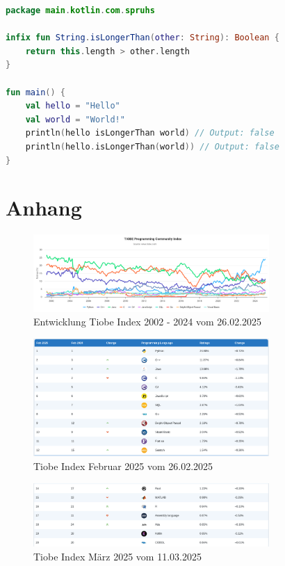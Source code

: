 \documentclass[11pt]{article}
\begin{document}
    \begin{lstlisting}[language=Kotlin, caption={InfixNotation.kt}, label={lst:kotlin-infix-notation}]
package main.kotlin.com.spruhs

infix fun String.isLongerThan(other: String): Boolean {
    return this.length > other.length
}

fun main() {
    val hello = "Hello"
    val world = "World!"
    println(hello isLongerThan world) // Output: false
    println(hello.isLongerThan(world)) // Output: false
}
    \end{lstlisting}

    \printbibliography[
        heading=bibintoc,
        title={Literaturverzeichnis}
    ]
    \appendix
    \section{Anhang}

    \begin{figure}[h]
        \centering
        \includegraphics[width=0.8\textwidth]{pictures/Screenshot 2025-02-26 at 19-53-49 TIOBE Index - TIOBE}
        \caption{Entwicklung Tiobe Index 2002 - 2024 vom 26.02.2025 }
        \label{fig:entwicklung-tiobe}
    \end{figure}

    \begin{figure}[h]
        \centering
        \includegraphics[width=0.8\textwidth]{pictures/Screenshot 2025-02-26 at 19-54-42 TIOBE Index - TIOBE}
        \caption{Tiobe Index Februar 2025 vom 26.02.2025}
        \label{fig:tiobe-java-2025}
    \end{figure}

    \begin{figure}[h]
        \centering
        \includegraphics[width=0.8\textwidth]{pictures/Screenshot 2025-03-11 at 22-21-04 TIOBE Index - TIOBE}
        \caption{Tiobe Index März 2025 vom 11.03.2025}
        \label{fig:tiobe-kotlin-2025}
    \end{figure}
\end{document}
